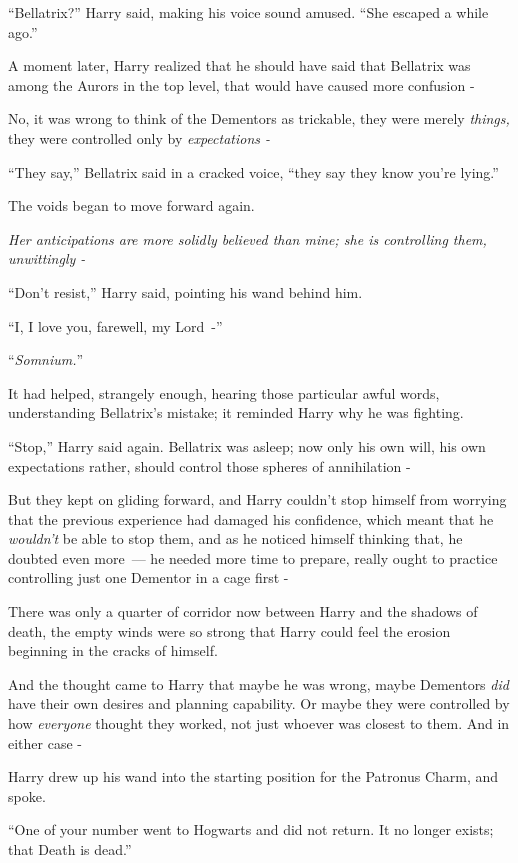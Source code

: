 ``Bellatrix?'' Harry said, making his voice sound amused. ``She escaped a while ago.''

A moment later, Harry realized that he should have said that Bellatrix was among the Aurors in the top level, that would have caused more confusion -

No, it was wrong to think of the Dementors as trickable, they were merely \emph{things,} they were controlled only by \emph{expectations -}

``They say,'' Bellatrix said in a cracked voice, ``they say they know you're lying.''

The voids began to move forward again.

\emph{Her anticipations are more solidly believed than mine; she is controlling them, unwittingly -}

``Don't resist,'' Harry said, pointing his wand behind him.

``I, I love you, farewell, my Lord~-''

``\emph{Somnium.}''

It had helped, strangely enough, hearing those particular awful words, understanding Bellatrix's mistake; it reminded Harry why he was fighting.

``Stop,'' Harry said again. Bellatrix was asleep; now only his own will, his own expectations rather, should control those spheres of annihilation -

But they kept on gliding forward, and Harry couldn't stop himself from worrying that the previous experience had damaged his confidence, which meant that he \emph{wouldn't} be able to stop them, and as he noticed himself thinking that, he doubted even more~--- he needed more time to prepare, really ought to practice controlling just one Dementor in a cage first -

There was only a quarter of corridor now between Harry and the shadows of death, the empty winds were so strong that Harry could feel the erosion beginning in the cracks of himself.

And the thought came to Harry that maybe he was wrong, maybe Dementors \emph{did} have their own desires and planning capability. Or maybe they were controlled by how \emph{everyone} thought they worked, not just whoever was closest to them. And in either case -

Harry drew up his wand into the starting position for the Patronus Charm, and spoke.

``One of your number went to Hogwarts and did not return. It no longer exists; that Death is dead.''

